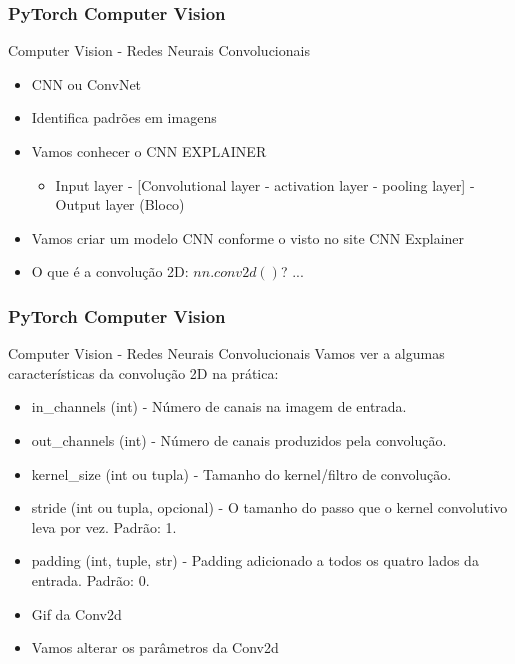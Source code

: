 \documentclass{beamer}
\begin{document}
\begin{frame}
	\frametitle{PyTorch Computer Vision}
	\begin{block}{Computer Vision - Redes Neurais Convolucionais}
		\begin{itemize}
			\item CNN ou ConvNet \href{https://en.wikipedia.org/wiki/Convolutional_neural_network}{} 
			\item Identifica padrões em imagens
			\item Vamos conhecer o CNN EXPLAINER \href{https://poloclub.github.io/cnn-explainer/}{} 
			\begin{itemize}
				\item Input layer - [Convolutional layer - activation layer - pooling layer] - Output layer (Bloco)
			\end{itemize}
			\item Vamos criar um modelo CNN conforme o visto no site CNN Explainer
			\item O que é a convolução 2D: $nn.conv2d()$? ...
		\end{itemize}
	\end{block}
\end{frame}
\begin{frame}
	\frametitle{PyTorch Computer Vision}
	\begin{block}{Computer Vision - Redes Neurais Convolucionais}
		Vamos ver a algumas características da convolução 2D na prática:
		\begin{itemize}
			\item in\_channels (int) - Número de canais na imagem de entrada.
			\item out\_channels (int) - Número de canais produzidos pela convolução.
			\item kernel\_size (int ou tupla) - Tamanho do kernel/filtro de convolução.
			\item stride (int ou tupla, opcional) - O tamanho do passo que o kernel convolutivo leva por vez. Padrão: 1.
			\item padding (int, tuple, str) - Padding adicionado a todos os quatro lados da entrada. Padrão: 0.
			\item Gif da Conv2d\href{https://github.com/mafaldasalomao/pavic_treinamento_ml/blob/main/Machine_Learning/figures/03-conv2d-layer.gif?raw=true}{} 
			\item Vamos alterar os parâmetros da Conv2d
		\end{itemize}
	\end{block}
\end{frame}
\end{document}
